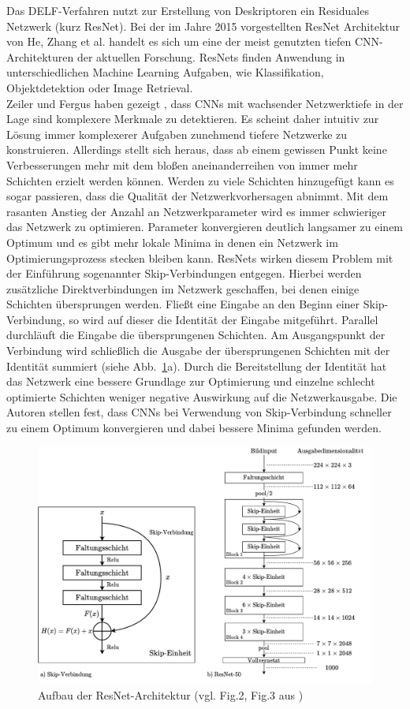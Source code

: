 Das DELF-Verfahren nutzt zur Erstellung von Deskriptoren ein Residuales Netzwerk (kurz ResNet). Bei der im Jahre 2015 vorgestellten ResNet Architektur \cite{resnet} von He, Zhang et al. handelt es sich um eine der meist genutzten tiefen CNN-Architekturen der aktuellen Forschung. ResNets finden Anwendung in unterschiedlichen Machine Learning Aufgaben, wie Klassifikation, Objektdetektion oder Image Retrieval.\\
Zeiler und Fergus haben gezeigt \cite{extraction_point_meaning}, dass CNNs mit wachsender Netzwerktiefe in der Lage sind komplexere Merkmale zu detektieren. Es scheint daher intuitiv zur Lösung immer komplexerer Aufgaben zunehmend tiefere Netzwerke zu konstruieren. Allerdings stellt sich heraus, dass ab einem gewissen Punkt keine Verbesserungen mehr mit dem bloßen aneinanderreihen von immer mehr Schichten erzielt werden können. Werden zu viele Schichten hinzugefügt kann es sogar passieren, dass die Qualität der Netzwerkvorhersagen abnimmt. Mit dem rasanten Anstieg der Anzahl an Netzwerkparameter wird es immer schwieriger das Netzwerk zu optimieren. Parameter konvergieren deutlich langsamer zu einem Optimum und es gibt mehr lokale Minima in denen ein Netzwerk im Optimierungsprozess stecken bleiben kann. ResNets wirken diesem Problem mit der Einführung sogenannter Skip-Verbindungen entgegen. Hierbei werden zusätzliche Direktverbindungen im Netzwerk geschaffen, bei denen einige Schichten übersprungen werden. Fließt eine Eingabe an den Beginn einer Skip-Verbindung, so wird auf dieser die Identität der Eingabe mitgeführt. Parallel durchläuft die Eingabe die übersprungenen Schichten. Am Ausgangspunkt der Verbindung wird schließlich die Ausgabe der übersprungenen Schichten mit der Identität summiert (siehe Abb.~\ref{resnet}a). Durch die Bereitstellung der Identität hat das Netzwerk eine bessere Grundlage zur Optimierung und einzelne schlecht optimierte Schichten weniger negative Auswirkung auf die Netzwerkausgabe. Die Autoren stellen fest, dass CNNs bei Verwendung von Skip-Verbindung schneller zu einem Optimum konvergieren und dabei bessere Minima gefunden werden. 
\\
\begin{figure}[h]
\includegraphics[scale=0.70]{resnet-50.pdf}
\caption{Aufbau der ResNet-Architektur (vgl. Fig.2, Fig.3 aus \cite{resnet})}
\label{resnet}
\end{figure}

